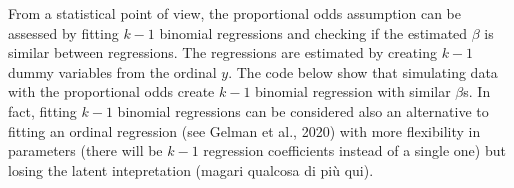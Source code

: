 \documentclass[
  man,floatsintext]{apa6}
\begin{document}
\normalsize

From a statistical point of view, the proportional odds assumption can be assessed by fitting \(k - 1\) binomial regressions and checking if the estimated \(\beta\) is similar between regressions. The regressions are estimated by creating \(k - 1\) dummy variables from the ordinal \(y\). The code below show that simulating data with the proportional odds create \(k - 1\) binomial regression with similar \(\beta\)s. In fact, fitting \(k - 1\) binomial regressions can be considered also an alternative to fitting an ordinal regression (see Gelman et al., 2020) with more flexibility in parameters (there will be \(k - 1\) regression coefficients instead of a single one) but losing the latent intepretation (magari qualcosa di più qui).

\scriptsize
\end{document}
